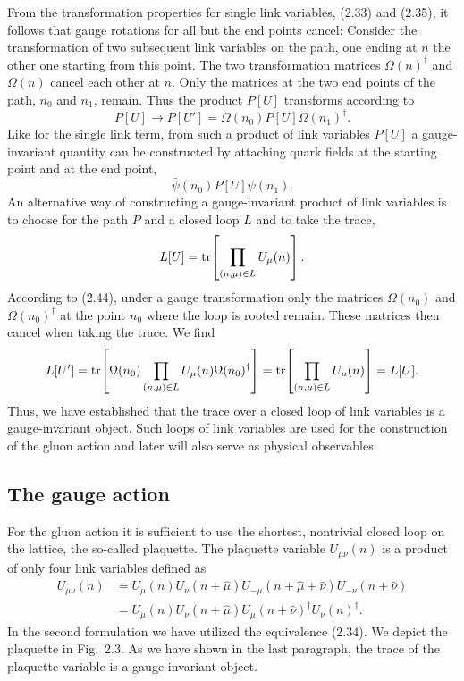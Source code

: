 From the transformation properties for single link variables, (2.33) and
(2.35), it follows that gauge rotations for all but the end points cancel:
Consider the transformation of two subsequent link variables on the path,
one ending at $n$ the other one starting from this point. The two
transformation matrices $\Omega(n)^\dagger$ and $\Omega(n)$ cancel each
other at $n$. Only the matrices at the two end points of the path, $n_0$
and $n_1$, remain. Thus the product $P[U]$ transforms according to
\begin{equation}
  P[U] \to P[U'] = \Omega(n_0) P[U] \Omega(n_1)^\dagger .
\end{equation}
Like for the single link term, from such a product of link variables $P[U]$
a gauge-invariant quantity can be constructed by attaching quark fields at
the starting point and at the end point,
\begin{equation}
  \bar\psi(n_0) P[U] \psi(n_1) .
\end{equation}
An alternative way of constructing a gauge-invariant product of link
variables is to choose for the path $P$ and a closed loop $L$ and to take
the trace,
\begin{equation}
  L[U] = \operatorname{tr}\!\left[ \prod_{(n,\mu)\in L} U_\mu(n) \right] .
\end{equation}
According to (2.44), under a gauge transformation only the matrices
$\Omega(n_0)$ and $\Omega(n_0)^\dagger$ at the point $n_0$ where the loop is
rooted remain. These matrices then cancel when taking the trace. We find
\begin{equation}
  L[U'] = \operatorname{tr}\!\left[ \Omega(n_0) \prod_{(n,\mu)\in L} U_\mu(n)
    \Omega(n_0)^\dagger \right] = \operatorname{tr}\!\left[ \prod_{(n,\mu)\in L} U_\mu(n)
    \right] = L[U] .
\end{equation}
Thus, we have established that the trace over a closed loop of link
variables is a gauge-invariant object. Such loops of link variables are used
for the construction of the gluon action and later will also serve as
physical observables.

\subsection{The gauge action}

For the gluon action it is sufficient to use the shortest, nontrivial
closed loop on the lattice, the so-called plaquette. The plaquette variable
$U_{\mu\nu}(n)$ is a product of only four link variables defined as
\begin{equation}
  \begin{split}
    U_{\mu\nu}(n) &= U_\mu(n) U_\nu(n + \hat\mu) U_{-\mu}(n + \hat\mu + \hat\nu)
      U_{-\nu}(n + \hat\nu)\\
    &= U_\mu(n) U_\nu(n + \hat\mu) U_\mu(n + \hat\nu)^\dagger U_\nu(n)^\dagger .
  \end{split}
\end{equation}
In the second formulation we have utilized the equivalence (2.34). We depict
the plaquette in Fig.~2.3. As we have shown in the last paragraph, the trace
of the plaquette variable is a gauge-invariant object.

